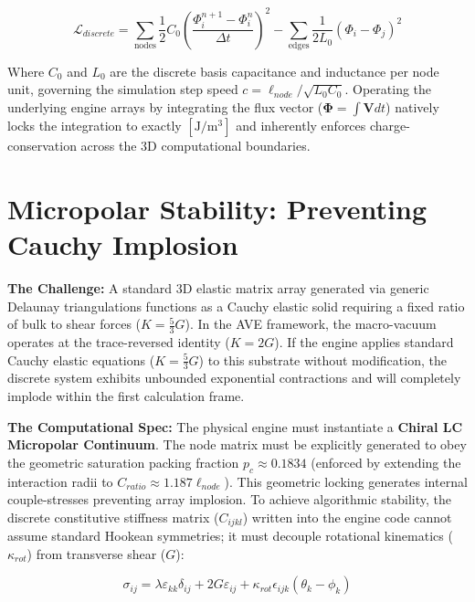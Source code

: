 \begin{equation}
    \mathcal{L}_{discrete} = \sum_{\text{nodes}} \frac{1}{2} C_0 \left( \frac{\Phi_i^{n+1} - \Phi_i^n}{\Delta t} \right)^2 - \sum_{\text{edges}} \frac{1}{2 L_0} (\Phi_i - \Phi_j)^2
\end{equation}

Where $C_0$ and $L_0$ are the discrete basis capacitance and inductance per node unit, governing the simulation step speed $c = \ell_{node}/\sqrt{L_0 C_0}$. Operating the underlying engine arrays by integrating the flux vector ($\mathbf{\Phi} = \int \mathbf{V} dt$) natively locks the integration to exactly $[\text{J}/\text{m}^3]$ and inherently enforces charge-conservation across the 3D computational boundaries.

\section{Micropolar Stability: Preventing Cauchy Implosion}

\textbf{The Challenge:} A standard 3D elastic matrix array generated via generic Delaunay triangulations functions as a Cauchy elastic solid requiring a fixed ratio of bulk to shear forces ($K = \frac{5}{3}G$). In the AVE framework, the macro-vacuum operates at the trace-reversed identity ($K = 2G$). If the engine applies standard Cauchy elastic equations ($K = \frac{5}{3}G$) to this substrate without modification, the discrete system exhibits unbounded exponential contractions and will completely implode within the first calculation frame.

\textbf{The Computational Spec:} The physical engine must instantiate a \textbf{Chiral LC Micropolar Continuum}. The node matrix must be explicitly generated to obey the geometric saturation packing fraction $p_c \approx 0.1834$ (enforced by extending the interaction radii to $C_{ratio} \approx 1.187 \ell_{node}$). This geometric locking generates internal couple-stresses preventing array implosion.
To achieve algorithmic stability, the discrete constitutive stiffness matrix ($C_{ijkl}$) written into the engine code cannot assume standard Hookean symmetries; it must decouple rotational kinematics ($\kappa_{rot}$) from transverse shear ($G$):

\begin{equation}
    \sigma_{ij} = \lambda \varepsilon_{kk} \delta_{ij} + 2G \varepsilon_{ij} + \kappa_{rot} \epsilon_{ijk} (\theta_k - \phi_k)
\end{equation}

